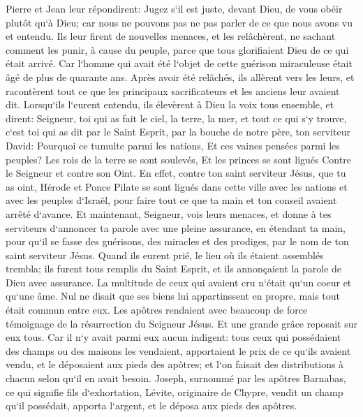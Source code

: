 \verse Pierre et Jean leur répondirent: Jugez s`il est juste, devant Dieu, de vous obéir plutôt qu`à Dieu; 
\verse car nous ne pouvons pas ne pas parler de ce que nous avons vu et entendu. 
\verse Ils leur firent de nouvelles menaces, et les relâchèrent, ne sachant comment les punir, à cause du peuple, parce que tous glorifiaient Dieu de ce qui était arrivé. 
\verse Car l`homme qui avait été l`objet de cette guérison miraculeuse était âgé de plus de quarante ans. 
\verse Après avoir été relâchés, ils allèrent vers les leurs, et racontèrent tout ce que les principaux sacrificateurs et les anciens leur avaient dit. 
\verse Lorsqu`ils l`eurent entendu, ils élevèrent à Dieu la voix tous ensemble, et dirent: Seigneur, toi qui as fait le ciel, la terre, la mer, et tout ce qui s`y trouve, 
\verse c`est toi qui as dit par le Saint Esprit, par la bouche de notre père, ton serviteur David: Pourquoi ce tumulte parmi les nations, Et ces vaines pensées parmi les peuples? 
\verse Les rois de la terre se sont soulevés, Et les princes se sont ligués Contre le Seigneur et contre son Oint. 
\verse En effet, contre ton saint serviteur Jésus, que tu as oint, Hérode et Ponce Pilate se sont ligués dans cette ville avec les nations et avec les peuples d`Israël, 
\verse pour faire tout ce que ta main et ton conseil avaient arrêté d`avance. 
\verse Et maintenant, Seigneur, vois leurs menaces, et donne à tes serviteurs d`annoncer ta parole avec une pleine assurance, 
\verse en étendant ta main, pour qu`il se fasse des guérisons, des miracles et des prodiges, par le nom de ton saint serviteur Jésus. 
\verse Quand ils eurent prié, le lieu où ils étaient assemblés trembla; ils furent tous remplis du Saint Esprit, et ils annonçaient la parole de Dieu avec assurance. 
\verse La multitude de ceux qui avaient cru n`était qu`un coeur et qu`une âme. Nul ne disait que ses biens lui appartinssent en propre, mais tout était commun entre eux. 
\verse Les apôtres rendaient avec beaucoup de force témoignage de la résurrection du Seigneur Jésus. Et une grande grâce reposait sur eux tous. 
\verse Car il n`y avait parmi eux aucun indigent: tous ceux qui possédaient des champs ou des maisons les vendaient, apportaient le prix de ce qu`ils avaient vendu, 
\verse et le déposaient aux pieds des apôtres; et l`on faisait des distributions à chacun selon qu`il en avait besoin. 
\verse Joseph, surnommé par les apôtres Barnabas, ce qui signifie fils d`exhortation, Lévite, originaire de Chypre, 
\verse vendit un champ qu`il possédait, apporta l`argent, et le déposa aux pieds des apôtres. 

